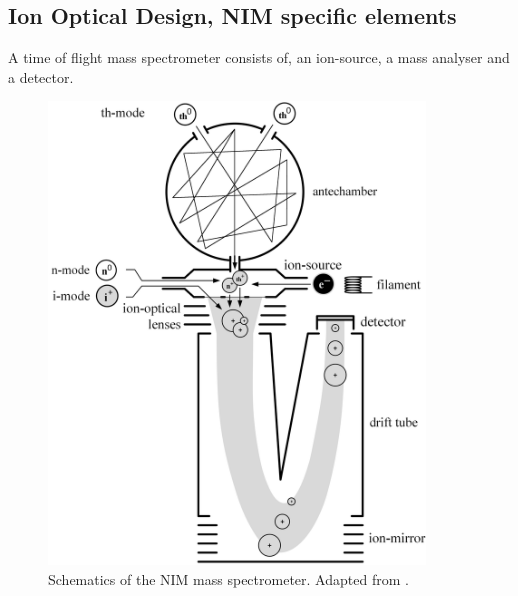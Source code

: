 	

	
	
	


	
	\subsection{Ion Optical Design, NIM specific elements} %
	A time of flight mass spectrometer consists of, an ion-source, a mass analyser and a detector.\\
	
	\begin{figure}[htb] %
		\centering
		\includegraphics[width= 10cm]{Bilder/NIM_Sketch.png} %
		\caption{Schematics of the NIM mass spectrometer. Adapted from \cite{Diss_Meyer}.}
		\label{fig:NIMSketch}
	\end{figure}

